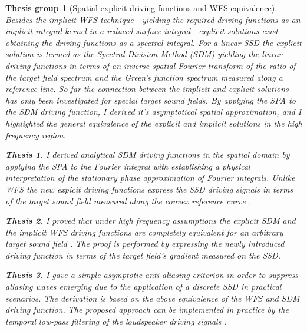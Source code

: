 \documentclass[10pt,twoside]{article}
\theoremstyle{thesisgroupstyle}
\newtheorem{thesisgroup}{Thesis group}
\theoremstyle{indented}
\newtheorem{thesis}{Thesis}[thesisgroup]
\begin{document}
\begin{thesisgroup}[Spatial explicit driving functions and WFS equivalence]
Besides the implicit WFS technique---yielding the required driving functions as an implicit integral kernel in a reduced surface integral---explicit solutions exist obtaining the driving functions as a spectral integral.
For a linear SSD the explicit solution is termed as the \emph{Spectral Division Method (SDM)} yielding the linear driving functions in terms of an inverse spatial Fourier transform of the ratio of the target field spectrum and the Green's function spectrum measured along a reference line.
So far the connection between the implicit and explicit solutions has only been investigated for special target sound fields.
By applying the SPA to the SDM driving function, I derived it's asymptotical spatial approximation, and I highlighted the general equivalence of the explicit and implicit solutions in the high frequency region. \cite{Firtha2017:daga_booklet, Firtha2018:WFS_vs_SDM_booklet}
\begin{thesis}
I derived analytical SDM driving functions in the spatial domain by applying the SPA to the Fourier integral with establishing a physical interpretation of the stationary phase approximation of Fourier integrals.
Unlike WFS the new expicit driving functions express the SSD driving signals in terms of the target sound field measured along the convex reference curve \cite{Firtha2017:daga_booklet}.\end{thesis}
\begin{thesis}
I proved that under high frequency assumptions the explicit SDM and the implicit WFS driving functions are completely equivalent for an arbitrary target sound field \cite{Firtha2018:WFS_vs_SDM_booklet}.
The proof is performed by expressing the newly introduced driving function in terms of the target field's gradient measured on the SSD.
\end{thesis}
\begin{thesis}
I gave a simple asymptotic anti-aliasing criterion in order to suppress aliasing waves emerging due to the application of a discrete SSD in practical scenarios.
The derivation is based on the above equivalence of the WFS and SDM driving function.
The proposed approach can be implemented in practice by the temporal low-pass filtering of the loudspeaker driving signals \cite{Firtha2018_daga_a_booklet}.
\end{thesis}
\end{thesisgroup}
\end{document}
